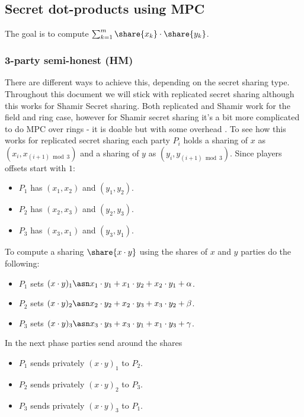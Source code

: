 \subsection{Secret dot-products using MPC}

The goal is to compute $\sum_{k=1}^m \share{x_k} \cdot \share{y_k}$.

\subsubsection{3-party semi-honest (HM)}
There are different ways to achieve this, depending on the secret sharing
type. Throughout this document we will stick with replicated secret sharing
although this works for Shamir Secret sharing. Both replicated and Shamir
work for the field and ring case, however for Shamir secret sharing it's a
bit more complicated to do MPC over rings - it is doable but with some
overhead \cite{EPRINT:CraRamXin19, TCC:ACDEY19}. To see how this works for
replicated secret sharing each party $P_i$ holds a sharing of $x$ as $(x_i,
x_{(i+1) \bmod 3})$ and a sharing of $y$ as $(y_i, y_{ (i+1) \bmod 3})$.
Since players offsets start with $1$:

\begin{itemize}
    \item $P_1$ has $(x_1, x_2)$ and $(y_1, y_2)$.
    \item $P_2$ has $(x_2, x_3)$ and $(y_2, y_3)$.
    \item $P_3$ has $(x_3, x_1)$ and $(y_3, y_1)$.
\end{itemize}

\noindent
To compute a sharing $\share{x \cdot y}$ using the shares of $x$ and $y$ parties do the following:

\begin{itemize}
    \item $P_1$ sets $(x \cdot y)_{1} \asn x_1 \cdot y_1 + x_1 \cdot y_2 + x_2 \cdot
    y_1 + \alpha$.
    \item $P_2$ sets $(x \cdot y)_2 \asn x_2 \cdot y_2 + x_2 \cdot y_3 + x_3
    \cdot y_2 + \beta$.
    \item $P_3$ sets $(x \cdot y)_3 \asn x_3 \cdot y_3 + x_3 \cdot y_1 + x_1 \cdot y_3 +
    \gamma$.
\end{itemize}

\noindent In the next phase parties send around the shares
\begin{itemize}
    \item $P_1$ sends privately $(x \cdot y)_1$ to $P_2$.
    \item $P_2$ sends privately $(x \cdot y)_2$ to $P_3$.
    \item $P_3$ sends privately $(x \cdot y)_3$ to $P_1$.
\end{itemize}

